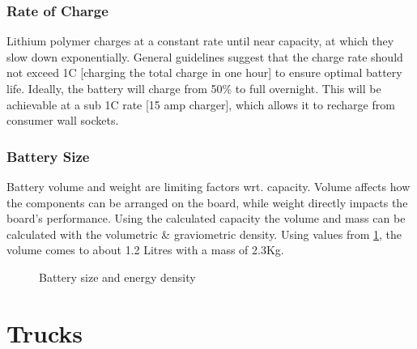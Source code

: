 \documentclass[journal,10pt]{IEEEtran}
\begin{document}
        \subsubsection{Rate of Charge}
            Lithium polymer charges at a constant rate until near capacity, at which they slow down exponentially. General guidelines suggest that the charge rate should not exceed 1C [charging the total charge in one hour] to ensure optimal battery life. Ideally, the battery will charge from 50\% to full overnight. This will be achievable at a sub 1C rate [15 amp charger], which allows it to recharge from consumer wall sockets.
        \subsubsection{Battery Size}
        Battery volume and weight are limiting factors wrt. capacity. Volume affects how the components can be arranged on the board, while weight directly impacts the board's performance.    
        Using the calculated capacity the volume and mass can be calculated with the volumetric \& graviometric density. Using values from \ref{fig:Battery Size}, the volume comes to about 1.2 Litres with a mass of 2.3Kg.
            \begin{figure}[H]
                \centering
                \caption{Battery size and energy density \cite{BatteryDensity}}
                \label{fig:Battery Size}
            \end{figure}
\section{Trucks}
\end{document}
